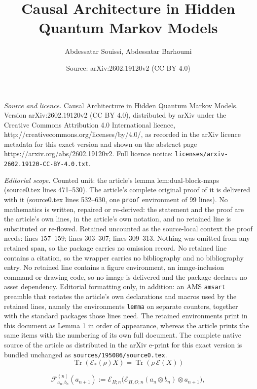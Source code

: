 \documentclass[10pt,a4paper]{amsart}
\title{Causal Architecture in Hidden Quantum Markov Models}
\author{Abdessatar Souissi, Abdessatar Barhoumi}
\date{Source: arXiv:2602.19120v2 (CC BY 4.0)}
\begin{document}
\maketitle

\noindent\emph{Source and licence.} Causal Architecture in Hidden Quantum Markov Models. Version arXiv:2602.19120v2 (CC BY 4.0), distributed by arXiv under the Creative Commons Attribution 4.0 International licence, http://creativecommons.org/licenses/by/4.0/, as recorded in the arXiv licence metadata for this exact version and shown on the abstract page https://arxiv.org/abs/2602.19120v2. Full licence notice: \texttt{licenses/arxiv-2602.19120-CC-BY-4.0.txt}.\par\smallskip

\noindent\textit{Editorial scope.} Counted unit: the article's lemma lem:dual-block-maps (source0.tex lines 471--530). The article's complete original proof of it is delivered with it (source0.tex lines 532--630, one \texttt{proof} environment of 99 lines). No mathematics is written, repaired or re-derived: the statement and the proof are the article's own lines, in the article's own notation, and no retained line is substituted or re-flowed.  Retained uncounted as the source-local context the proof needs: lines 157--159; lines 303--307; lines 309--313.  Nothing was omitted from any retained span, so the package carries no omission record.  No retained line contains a citation, so the wrapper carries no bibliography and no bibliography entry.  No retained line contains a figure environment, an image-inclusion command or drawing code, so no image is delivered and the package declares no asset dependency.  Editorial formatting only, in addition: an AMS \texttt{amsart} preamble that restates the article's own declarations and macros used by the retained lines, namely the environments \texttt{lemma} on separate counters, together with the standard packages those lines need.  The retained environments print in this document as Lemma 1 in order of appearance, whereas the article prints the same items with the numbering of its own full document.  The complete native source of the article as distributed in the arXiv e-print for this exact version is bundled unchanged as \texttt{sources/195086/source0.tex}.
\begin{equation}\label{eq_HS}
\operatorname{Tr}(\mathcal{E}_*(\rho)X)=\operatorname{Tr}(\rho\,\mathcal{E}(X))
\end{equation}

\begin{equation}\label{eq_F}
\mathcal{F}_{a_n,b_n}^{(n)}(a_{n+1})
:=
\mathcal{E}_{H;n}\bigl(\mathcal{E}_{H,O;n}(a_n\otimes b_n)\otimes a_{n+1}\bigr),
\end{equation}
\end{document}
